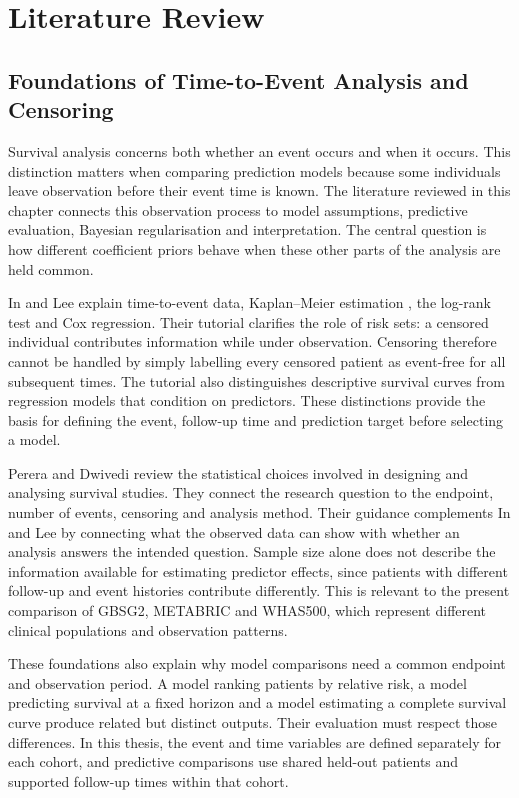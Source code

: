 \chapter{Literature Review}\label{literature-review}

\section{Foundations of Time-to-Event Analysis and Censoring}\label{foundations-of-time-to-event-analysis-and-censoring}

Survival analysis concerns both whether an event occurs and when it occurs. This distinction matters when comparing prediction models because some individuals leave observation before their event time is known. The literature reviewed in this chapter connects this observation process to model assumptions, predictive evaluation, Bayesian regularisation and interpretation. The central question is how different coefficient priors behave when these other parts of the analysis are held common.

In and Lee \cite{ref14} explain time-to-event data, Kaplan--Meier estimation \cite{kaplan1958}, the log-rank test and Cox regression. Their tutorial clarifies the role of risk sets: a censored individual contributes information while under observation. Censoring therefore cannot be handled by simply labelling every censored patient as event-free for all subsequent times. The tutorial also distinguishes descriptive survival curves from regression models that condition on predictors. These distinctions provide the basis for defining the event, follow-up time and prediction target before selecting a model.

Perera and Dwivedi \cite{ref15} review the statistical choices involved in designing and analysing survival studies. They connect the research question to the endpoint, number of events, censoring and analysis method. Their guidance complements In and Lee by connecting what the observed data can show with whether an analysis answers the intended question. Sample size alone does not describe the information available for estimating predictor effects, since patients with different follow-up and event histories contribute differently. This is relevant to the present comparison of GBSG2, METABRIC and WHAS500, which represent different clinical populations and observation patterns.

These foundations also explain why model comparisons need a common endpoint and observation period. A model ranking patients by relative risk, a model predicting survival at a fixed horizon and a model estimating a complete survival curve produce related but distinct outputs. Their evaluation must respect those differences. In this thesis, the event and time variables are defined separately for each cohort, and predictive comparisons use shared held-out patients and supported follow-up times within that cohort.

